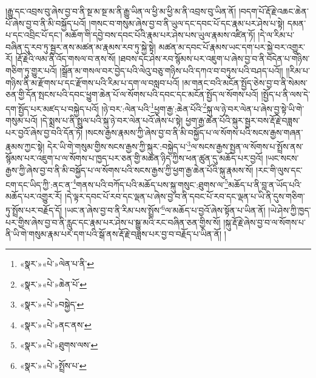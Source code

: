 །རྒྱུ་དང་འབྲས་བུ་ཞེས་བྱ་བ་ནི་སྔ་མ་སྔ་མ་ནི་རྒྱུ་ཡིན་ལ་ཕྱི་མ་ཕྱི་མ་ནི་འབྲས་བུ་ཡིན་ནོ། །བདག་པོ་རྡོ་རྗེ་འཆང་ཆེན་པོ་ཞེས་བྱ་བ་ནི་མི་བསྐྱོད་པའོ། །གསང་བ་གསུམ་ཞེས་བྱ་བ་ནི་ཡུལ་དང་དབང་པོ་དང་རྣམ་པར་ཤེས་པ་སྟེ། དམན་པ་དང་འབྲིང་པོ་དང་། མཆོག་གི་དབྱེ་བས་དབང་པོའི་རྣམ་པར་ཤེས་པས་ཡུལ་རྣམས་འཛིན་ཏོ། །དེ་ལ་རིམ་པ་བཞིན་དུ་རབ་ཏུ་སྦྱར་ནས་མཚན་མ་རྣམས་རབ་ཏུ་སྐྱེ་སྟེ། མཚན་མ་དབང་པོ་རྣམས་ཡང་དག་པར་སྐྱེ་བར་འགྱུར་རོ། །རྡོ་རྗེའི་ལམ་ནི་འོད་གསལ་བ་ནས་སོ། །ཐབས་དང་ཤེས་རབ་སྙོམས་པར་འཇུག་པ་ཞེས་བྱ་བ་ནི་བདེན་པ་གཉིས་གཅིག་ཏུ་གྱུར་པའོ། །སྒྲོན་མ་གསལ་བར་བྱེད་པའི་ལེའུ་བཅུ་གཉིས་པའི་དཀའ་བ་བཏུས་པའི་བཤད་པའོ།། །།རིམ་པ་གཉིས་ནི་མ་རྫོགས་པ་དང་རྫོགས་པའི་རིམ་པ་དག་ལ་བསླབ་པའོ། །མ་གནང་བའི་མངོན་སྤྱོད་ཅེས་བྱ་བ་ནི་སེམས་ཅན་གྱི་དོན་སྤངས་པའི་དབང་ཕྱུག་ཆེན་པོ་ལ་སོགས་པའི་དབང་དང་མངོན་སྤྱོད་ལ་སོགས་པའོ། །སྤྱོད་པ་ནི་ལས་དེ་དག་སྤྱོད་པར་མཛད་པ་བསྐྱེད་པའོ། །ཉེ་བར་:ལེན་པའི་\footnote{«སྣར་»«པེ་»ལེན་པ་ནི་}ཕྱག་རྒྱ་:ཆེན་པོའི་\footnote{«སྣར་»«པེ་»ཆེན་པོ་}སྐུ་ལ་ཉེ་བར་ལེན་པ་ཞེས་བྱ་སྟེ་ཡི་གེ་གསུམ་པའོ། །དེ་སྨྲས་པ་ནི་སྤྲུལ་པའི་སྐུ་ཉེ་བར་ལེན་པའོ་ཞེས་པ་སྟེ། ཕྱག་རྒྱ་ཆེན་པོའི་སྐུར་སྦྱར་བས་རྡོ་རྗེ་བཟླས་པར་བྱའོ་ཞེས་བྱ་བའི་དོན་ཏོ། །སངས་རྒྱས་རྣམས་ཀྱི་ཞེས་བྱ་བ་ནི་མི་བསྐྱོད་པ་ལ་སོགས་པའི་སངས་རྒྱས་གཞན་རྣམས་ཀྱང་སྟེ། དེར་ཡི་གེ་གསུམ་གྱིས་སངས་རྒྱས་ཀྱི་སྐུར་:བསྐྱེད་པ་\footnote{«སྣར་»«པེ་»བསྐྱེད་}ལ་སངས་རྒྱས་སྤྱན་ལ་སོགས་པ་སྤྲོས་ནས་སྙོམས་པར་འཇུག་པ་ལ་སོགས་པ་ཁྱད་པར་ཅན་གྱི་མཚན་ཉིད་ཀྱིས་ཕན་ཚུན་དུ་མཆོད་པར་བྱའོ། །ཡང་སངས་རྒྱས་ཀྱི་ཞེས་བྱ་བ་ནི་མི་བསྐྱོད་པ་ལ་སོགས་པའི་སངས་རྒྱས་ཀྱི་ཕྱག་རྒྱ་ཆེན་པོའི་སྐུ་རྣམས་སོ། །རང་གི་ལུས་དང་ངག་དང་ཡིད་ཀྱི་:ནང་ན་\footnote{«སྣར་»«པེ་»ནང་ནས་}གནས་པའི་བཀོད་པའི་མཆོད་པས་སྐུ་གསུང་:ཐུགས་ལ་\footnote{«སྣར་»«པེ་»ཐུགས་ལས་}མཆོད་པ་ནི་བླ་ན་ཡོད་པའི་མཆོད་པར་འགྱུར་རོ། །དེ་ལྟར་དབང་པོ་རབ་དང་ལྡན་པ་ཞེས་བྱ་བ་ནི་དབང་པོ་རབ་དང་ལྡན་པ་ཡི་ནི་དུས་གཅིག་ཏུ་སྤྲོས་པར་བརྗོད་དོ། །ཡང་ན་ཞེས་བྱ་བ་ནི་རིམ་པས་སྤྲོས་\footnote{«སྣར་»«པེ་»སྤྲོས་པ་}ལ་མཆོད་པ་བྱའོ་ཞེས་སྟོན་པ་ཡིན་ནོ། །ཡེ་ཤེས་ཀྱི་ཁྱད་པར་གྱིས་ཞེས་བྱ་བ་ནི་རླུང་དང་རྣམ་པར་ཤེས་པ་སྒྱུ་མའི་རང་བཞིན་ཅན་གྱིས་སོ། །སྐུ་རྡོ་རྗེ་ཞེས་བྱ་བ་ལ་སོགས་པ་ནི་ཡི་གེ་གསུམ་རྣམ་པར་དག་པའི་སྒོ་ནས་རྡོ་རྗེ་བཟླས་པར་བྱ་བ་བརྗོད་པ་ཡིན་ནོ། །
